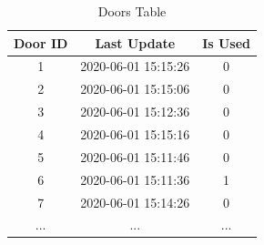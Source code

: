 \begin{table}[htb]
\centering
\begin{tabular}{|c|c|c|} 
\hline
Door ID & Last Update & Is Used \\ \hline
1 & 2020-06-01 15:15:26 & 0 \\ \hline
2 & 2020-06-01 15:15:06 & 0 \\ \hline
3 & 2020-06-01 15:12:36 & 0 \\ \hline
4 & 2020-06-01 15:15:16 & 0 \\ \hline
5 & 2020-06-01 15:11:46 & 0 \\ \hline
6 & 2020-06-01 15:11:36 & 1 \\ \hline
7 & 2020-06-01 15:14:26 & 0 \\ \hline
...& ...& ... \\ \hline
\end{tabular}
\caption{Doors Table}
\label{tab:db_doors}
\end{table}


